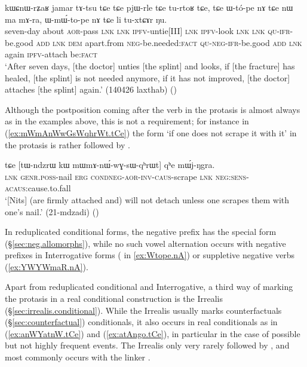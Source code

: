 \begin{exe}
\ex \label{ex:Wtope.nA}
 \gll   kɯɕnɯ-rʑaʁ jamar tɤ-tsu tɕe tɕe pjɯ-rle tɕe tu-rtoʁ tɕe, tɕe ɯ-tó-pe nɤ tɕe nɯ ma mɤ-ra,
ɯ-mɯ́-to-pe nɤ tɕe li tu-xtɕɤr ŋu. \\
seven-day about \textsc{aor}-pass \textsc{lnk} \textsc{lnk} \textsc{ipfv}-untie[III] \textsc{lnk} \textsc{ipfv}-look \textsc{lnk} \textsc{lnk} \textsc{qu}-\textsc{ifr}-be.good \textsc{add} \textsc{lnk} \textsc{dem} apart.from \textsc{neg}-be.needed:\textsc{fact} \textsc{qu}-\textsc{neg}-\textsc{ifr}-be.good \textsc{add} \textsc{lnk} again \textsc{ipfv}-attach be:\textsc{fact} \\
\glt `After seven days, [the doctor] unties [the splint] and looks, if [the fracture] has healed, [the splint] is not needed anymore, if it has not improved, [the doctor] attaches [the splint] again.' (140426 laxthab)
()
\end{exe}
 
Although the postposition coming after the verb in the protasis is almost always  as in the examples above, this is not a requirement; for instance in (\ref{ex:mWmAnWwGsWqhrWt.tCe}) the form  `if one does not scrape it with it' in the protasis is rather followed by .

 \begin{exe}
\ex \label{ex:mWmAnWwGsWqhrWt.tCe}
 \gll tɕe [tɯ-ndzrɯ kɯ mɯ\redp{}mɤ-nɯ́-wɣ-sɯ-qʰrɯt] qʰe mɯ́j-ŋgra. \\
 \textsc{lnk} \textsc{genr}.\textsc{poss}-nail \textsc{erg} \textsc{cond}\redp{}\textsc{neg}-\textsc{aor}-\textsc{inv}-\textsc{caus}-scrape \textsc{lnk} \textsc{neg}:\textsc{sens}-\textsc{acaus}:cause.to.fall \\
 \glt `[Nits] (are firmly attached and) will not detach unless one scrapes them with one's nail.' (21-mdzadi)
 ()
 \end{exe}

In reduplicated conditional forms, the negative prefix  has the special form  (§\ref{sec:neg.allomorphs}), while no such vowel alternation occurs with negative prefixes in Interrogative forms ( in \ref{ex:Wtope.nA}) or suppletive negative verbs (\ref{ex:YWYWmaR.nA}).

Apart from reduplicated conditional and Interrogative, a third way of marking the protasis in a real conditional construction is the Irrealis (§\ref{sec:irrealis.conditional}). While the Irrealis usually marks counterfactuals (§\ref{sec:counterfactual}) conditionals, it also occurs in real conditionals as in (\ref{ex:anWYatnW.tCe}) and (\ref{ex:atAngo.tCe}), in particular in the case of possible but not highly frequent events. The Irrealis only very rarely followed by , and most commonly occurs with the linker .

